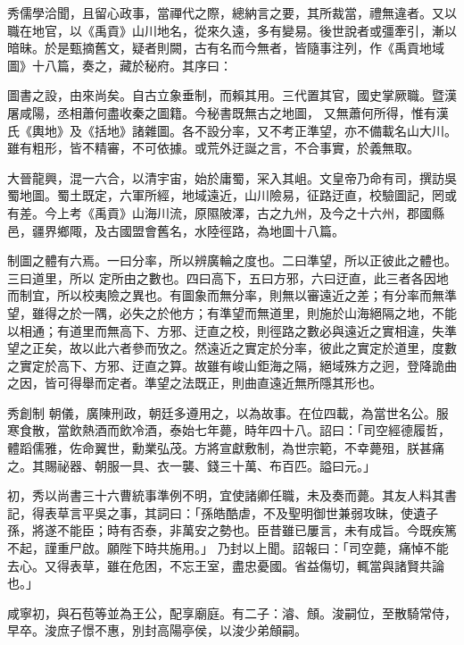 \begin{pinyinscope}
 秀儒學洽聞，且留心政事，當禪代之際，總納言之要，其所裁當，禮無違者。又以職在地官，以《禹貢》山川地名，從來久遠，多有變易。後世說者或彊牽引，漸以暗昧。於是甄摘舊文，疑者則闕，古有名而今無者，皆隨事注列，作《禹貢地域圖》十八篇，奏之，藏於秘府。其序曰：



 圖書之設，由來尚矣。自古立象垂制，而賴其用。三代置其官，國史掌厥職。暨漢屠咸陽，丞相蕭何盡收秦之圖籍。今秘書既無古之地圖，
 又無蕭何所得，惟有漢氏《輿地》及《括地》諸雜圖。各不設分率，又不考正準望，亦不備載名山大川。雖有粗形，皆不精審，不可依據。或荒外迂誕之言，不合事實，於義無取。



 大晉龍興，混一六合，以清宇宙，始於庸蜀，冞入其岨。文皇帝乃命有司，撰訪吳蜀地圖。蜀土既定，六軍所經，地域遠近，山川險易，征路迂直，校驗圖記，罔或有差。今上考《禹貢》山海川流，原隰陂澤，古之九州，及今之十六州，郡國縣邑，疆界鄉陬，及古國盟會舊名，水陸徑路，為地圖十八篇。



 制圖之體有六焉。一曰分率，所以辨廣輪之度也。二曰準望，所以正彼此之體也。三曰道里，所以
 定所由之數也。四曰高下，五曰方邪，六曰迂直，此三者各因地而制宜，所以校夷險之異也。有圖象而無分率，則無以審遠近之差；有分率而無準望，雖得之於一隅，必失之於他方；有準望而無道里，則施於山海絕隔之地，不能以相通；有道里而無高下、方邪、迂直之校，則徑路之數必與遠近之實相違，失準望之正矣，故以此六者參而攷之。然遠近之實定於分率，彼此之實定於道里，度數之實定於高下、方邪、迂直之算。故雖有峻山鉅海之隔，絕域殊方之迥，登降詭曲之因，皆可得舉而定者。準望之法既正，則曲直遠近無所隱其形也。



 秀創制
 朝儀，廣陳刑政，朝廷多遵用之，以為故事。在位四載，為當世名公。服寒食散，當飲熱酒而飲冷酒，泰始七年薨，時年四十八。詔曰：「司空經德履哲，體蹈儒雅，佐命翼世，勳業弘茂。方將宣獻敷制，為世宗範，不幸薨殂，朕甚痛之。其賜祕器、朝服一具、衣一襲、錢三十萬、布百匹。謚曰元。」



 初，秀以尚書三十六曹統事準例不明，宜使諸卿任職，未及奏而薨。其友人料其書記，得表草言平吳之事，其詞曰：「孫皓酷虐，不及聖明御世兼弱攻昧，使遺子孫，將遂不能臣；時有否泰，非萬安之勢也。臣昔雖已屢言，未有成旨。今既疾篤不起，謹重尸啟。願陛下時共施用。」
 乃封以上聞。詔報曰：「司空薨，痛悼不能去心。又得表草，雖在危困，不忘王室，盡忠憂國。省益傷切，輒當與諸賢共論也。」



 咸寧初，與石苞等並為王公，配享廟庭。有二子：濬、頠。浚嗣位，至散騎常侍，早卒。浚庶子憬不惠，別封高陽亭侯，以浚少弟頠嗣。




\end{pinyinscope}
